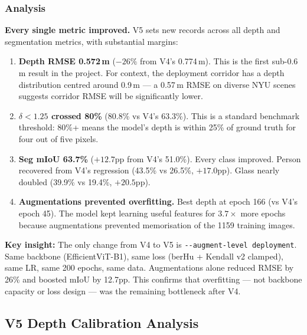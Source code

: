 \documentclass[11pt,a4paper]{article}
\begin{document}
\subsubsection{Analysis}

\textbf{Every single metric improved.} V5 sets new records across all depth and
segmentation metrics, with substantial margins:

\begin{enumerate}[nosep]
  \item \textbf{Depth RMSE 0.572\,m} ($-26\%$ from V4's 0.774\,m). This is the
    first sub-0.6\,m result in the project. For context, the deployment corridor
    has a depth distribution centred around 0.9\,m --- a 0.57\,m RMSE on diverse
    NYU scenes suggests corridor RMSE will be significantly lower.

  \item \textbf{$\delta < 1.25$ crossed 80\%} (80.8\% vs V4's 63.3\%). This is a
    standard benchmark threshold: 80\%+ means the model's depth is within 25\%
    of ground truth for four out of five pixels.

  \item \textbf{Seg mIoU 63.7\%} ($+12.7$pp from V4's 51.0\%). Every class
    improved. Person recovered from V4's regression (43.5\% vs 26.5\%,
    $+17.0$pp). Glass nearly doubled (39.9\% vs 19.4\%, $+20.5$pp).

  \item \textbf{Augmentations prevented overfitting.} Best depth at epoch 166
    (vs V4's epoch 45). The model kept learning useful features for
    $3.7\times$ more epochs because augmentations prevented memorisation
    of the 1159 training images.
\end{enumerate}

\textbf{Key insight:} The only change from V4 to V5 is
\texttt{-{}-augment-level deployment}. Same backbone (EfficientViT-B1),
same loss (berHu + Kendall v2 clamped), same LR, same 200 epochs, same data.
Augmentations alone reduced RMSE by 26\% and boosted mIoU by 12.7pp.
This confirms that overfitting --- not backbone capacity or loss design ---
was the remaining bottleneck after V4.

\subsection{V5 Depth Calibration Analysis}
\label{sec:vivek-v5-calibration}
\end{document}
